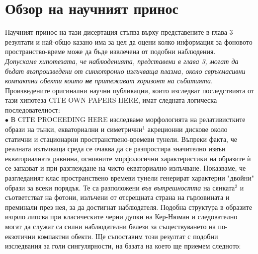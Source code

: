 \section{Обзор на научният принос}

Научният принос на тази дисертация стъпва върху представените в глава 3 резултати и най-общо казано има за цел да оцени колко информация за фоновото пространство-време може да бъде извлечена от подобни наблюдения.\\

 \emph{Допускаме хипотезата, че наблюденията, представени в глава 3, могат да бъдат възпроизведени от синхотронно излъчваща плазма, около свръхмасивни компактни обекти които \textbf{не} притежават хоризонт на събитията}.\\\newline
Произведените оригинални научни публикации, които изследват последствията от тази хипотеза CITE OWN PAPERS HERE, имат следната логическа последователност: \\

$\bullet$ В CITE PROCEEDING HERE изследваме морфологията на релативистките образи на тънки, екваториални и симетрични$^1$ акреционни дискове около статични и стационарни пространствено-времеви тунели. Въпреки факта, че реалната излъчваща среда се очаква да се разпростира значително извън екваториалната равнина, основните морфологични характеристики на образите ѝ се запазват и при разглеждане на чисто екваториално излъчване. Показваме, че разгледаният клас пространствено времеви тунели генерират характерни "двойни"$\,$ образи за всеки порядък. Те са разположени \emph{във вътрешността} на сянката$^2$ и съответстват на фотони, излъчени от отсрещната страна на гърловината и преминали през нея, за да достигнат наблюдателя. Подобна структура в образите изцяло липсва при класическите черни дупки на Кер-Нюман и следователно могат да служат са силни наблюдателни белези за съществуването на по-екзотични компактни обекти. Ще съпоставим този резултат с подобни изследвания за голи сингулярности, на базата на което ще приемем следното:\\


